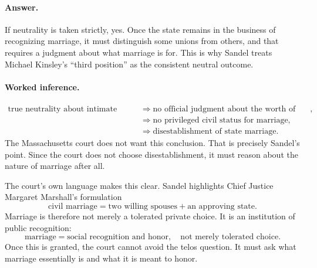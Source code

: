 \paragraph{Answer.} If neutrality is taken strictly, yes. Once the state remains in the business of recognizing marriage, it must distinguish some unions from others, and that requires a judgment about what marriage is for. This is why Sandel treats Michael Kinsley's ``third position'' as the consistent neutral outcome.

\paragraph{Worked inference.}
\begin{align}
\text{true neutrality about intimate associations}
&\Longrightarrow
\text{no official judgment about the worth of unions},\\
&\Longrightarrow
\text{no privileged civil status for marriage},\\
&\Longrightarrow
\text{disestablishment of state marriage}.
\end{align}
The Massachusetts court does not want this conclusion. That is precisely Sandel's point. Since the court does not choose disestablishment, it must reason about the nature of marriage after all.

The court's own language makes this clear. Sandel highlights Chief Justice Margaret Marshall's formulation
\begin{equation}
\text{civil marriage}
=
\text{two willing spouses} + \text{an approving state}.
\end{equation}
Marriage is therefore not merely a tolerated private choice. It is an institution of public recognition:
\begin{equation}
\text{marriage}
=
\text{social recognition and honor},
\quad
\text{not merely tolerated choice}.
\end{equation}
Once this is granted, the court cannot avoid the telos question. It must ask what marriage essentially is and what it is meant to honor.


